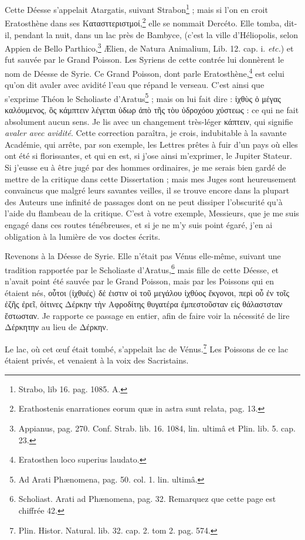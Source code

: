 \documentclass[a4paper, 11pt, oneside, polutonikogreek, french]{article}
\begin{document}
Cette Déesse s'appelait Atargatis, suivant Strabon\footnote{Strabo, lib 16. pag. 1085. A.} ; mais si l'on en croit Eratosthène dans ses Κατασττεριστμοί,\footnote{Erathostenis enarrationes eorum quæ in astra sunt relata, pag. 13.} elle se nommait Dercéto. Elle tomba, dit-il, pendant la nuit, dans un lac près de Bambyce, (c'est la ville d'Héliopolis, selon Appien de Bello Parthico,\footnote{Appianus, pag. 270. Conf. Strab. lib. 16. 1084, lin. ultimâ et Plin. lib. 5. cap. 23.} Ælien, de Natura Animalium, Lib. 12. cap. i. \emph{etc.}) et fut sauvée par le Grand Poisson. Les Syriens de cette contrée lui donnèrent le nom de Déesse de Syrie. Ce Grand Poisson, dont parle Eratosthène,\footnote{Eratosthen loco superius laudato.} est celui qu'on dit avaler avec avidité l'eau que répand le verseau. C'est ainsi que s'exprime Théon le Scholiaste d'Aratus\footnote{Ad Arati Phænomena, pag. 50. col. 1. lin. ultimâ.} ; mais on lui fait dire : ἰχθὺς ὁ μέγας καλόυμενος, ὃς κάμπτειν λέγεται ὑδωρ ἀπὸ τῆς τὸυ ὑδροχόου χύστεως : ce qui ne fait absolument aucun sens. Je lis avec un changement très-léger κάπτειν, qui signifie \emph{avaler avec avidité}. Cette correction paraîtra, je crois, indubitable à la savante Académie, qui arrête, par son exemple, les Lettres prêtes à fuir d'un pays où elles ont été si florissantes, et qui en est, si j'ose ainsi m'exprimer, le Jupiter Stateur. Si j'eusse eu à être jugé par des hommes ordinaires, je me serais bien gardé de mettre de la critique dans cette Dissertation ; mais mes Juges sont heureusement convaincus que malgré leurs savantes veilles, il se trouve encore dans la plupart des Auteurs une infinité de passages dont on ne peut dissiper l'obscurité qu'à l'aide du flambeau de la critique. C'est à votre exemple, Messieurs, que je me suis engagé dans ces routes ténébreuses, et si je ne m'y suis point égaré, j'en ai obligation à la lumière de vos doctes écrits.

Revenons à la Déesse de Syrie. Elle n'était pas Vénus elle-même, suivant une tradition rapportée par le Scholiaste d'Aratus,\footnote{Scholiast. Arati ad Phænomena, pag. 32. Remarquez que cette page est chiffrée 42.} mais fille de cette Déesse, et n'avait point été sauvée par le Grand Poisson, mais par les Poissons qui en étaient nés, οὗτοι (ἰχθυές) δέ ἐιστιν οἱ τοῦ μεγάλου ἰχθύος ἔκγονοι, περὶ οὗ ἐν τοῖς ἐζῆς ἐρεῖ, ὁίτινες Δέρκην τὴν Αφροδίτης θυγατέρα ἐμπεστοῦσταν εἰς θάλαστσταν ἔστωσταν. Je rapporte ce passage en entier, afin de faire voir la nécessité de lire Δέρκητην au lieu de Δέρκην.

Le lac, où cet œuf était tombé, s'appelait lac de Vénus.\footnote{Plin. Histor. Natural. lib. 32. cap. 2. tom 2. pag. 574.} Les Poissons de ce lac étaient privés, et venaient à la voix des Sacristains.
\end{document}
